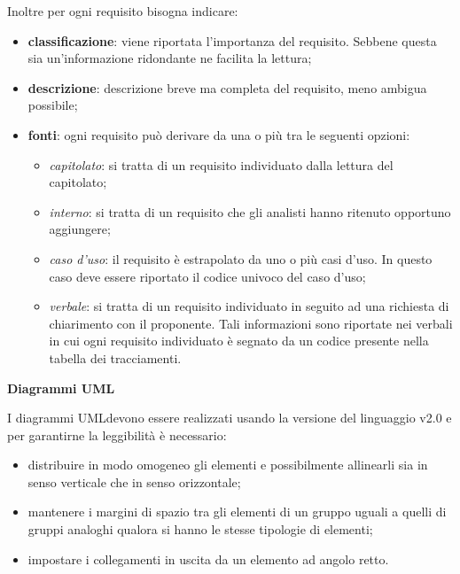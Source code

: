 			\noindent
			Inoltre per ogni requisito bisogna indicare:	
				\begin{itemize}		
					\item \textbf{classificazione}: viene riportata l'importanza del requisito. 
						Sebbene questa sia un'informazione ridondante ne facilita la lettura;
					\item \textbf{descrizione}: descrizione breve ma completa del requisito, 
						meno ambigua possibile;
					\item \textbf{fonti}: ogni requisito può derivare da una o più tra le 
					seguenti opzioni:
					\begin{itemize}
						\item \textit{capitolato\glo}: si tratta di un requisito individuato dalla 
							lettura del capitolato\glo;
						\item \textit{interno}: si tratta di un requisito che gli analisti hanno 
							ritenuto opportuno aggiungere;
						\item \textit{caso d'uso}: il requisito è estrapolato da uno o più casi 
							d'uso. In questo caso deve essere riportato il codice univoco del caso d'uso;
						\item \textit{verbale}: si tratta di un requisito individuato in seguito ad 
							una richiesta di chiarimento con il proponente. Tali informazioni sono riportate 
							nei verbali in cui ogni requisito individuato è segnato da un codice presente 
							nella tabella dei tracciamenti. \\
					\end{itemize}
				\end{itemize}
			
			\noindent\textbf{Diagrammi UML} \mbox{}\\ \label{sec:UML}
			
			\noindent I diagrammi UML\glosp devono essere realizzati usando la versione del 
			linguaggio v2.0 e per garantirne la leggibilità è necessario:
				\begin{itemize}
					\item distribuire in modo omogeneo gli elementi e possibilmente allinearli 
						sia in senso verticale che in senso orizzontale;
					\item mantenere i margini di spazio tra gli elementi di un gruppo uguali a 
						quelli di gruppi analoghi qualora si hanno le stesse tipologie di elementi;
					\item impostare i collegamenti in uscita da un elemento ad angolo retto. 
				\end{itemize}

